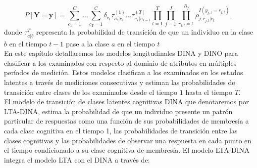 	\begin{equation}
		P\left[\mathbf{Y}=\mathbf{y}\right]=\sum_{c_{1}=1}^{C} \ldots \sum_{c_{T}=1}^{C} \delta_{c_{1}} \tau_{c_{2}|c_{1}}^{(1)}\ldots \tau_{c_{T} | c_{T-1}}^{(T)} \prod_{t=1}^{T}{ \prod _{ j=1 }^{ J }{ \prod _{ { r }_{ j,t }=1 }^{ { R }_{ j } }{ { \rho  }_{ j,{ r }_{ j,t }|{ c }_{ t } }^{ I({ y }_{ j,t }={ r }_{ j,t }) } }  }  }  \label{3.8}
,
\end{equation}
donde $\tau_{{a}|{b}}^{T}$ representa la probabilidad de transici\'{o}n de que un individuo en la clase $b$ en el tiempo $t-1$ pase a la clase $a$ en el tiempo $t$\\
	En este cap\'{i}tulo detallaremos los modelos longitudinales DINA y DINO para clasificar a los examinados con respecto al dominio de atributos en m\'{u}ltiples per\'{i}odos de medici\'{o}n. Estos modelos clasifican a los examinados en los estados latentes a trav\'{e}s de mediciones consecutivas y estiman las probabilidades de transici\'{o}n entre clases de los examinados desde el tiempo $1$ hasta el tiempo $T$.\\
	El modelo de transici\'{o}n de clases latentes cognitivas DINA que denotaremos por LTA-DINA, estima la probabilidad de que un individuo presente un patrón particular de respuestas como una funci\'{o}n de sus probabilidades de membres\'{i}a a cada clase cognitiva en el tiempo 1, las probabilidades de transici\'{o}n entre las clases cognitivas y las probabilidades de observar una respuesta en cada punto en el tiempo condicionado a su clase cognitiva de membres\'{i}a. El modelo LTA-DINA integra el modelo LTA con el DINA a trav\'{e}s de:
	
